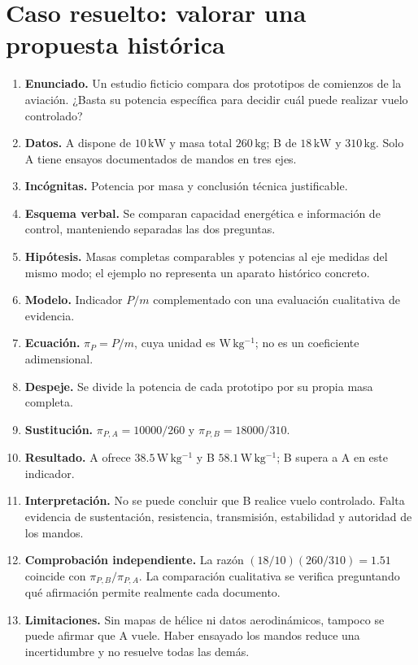 \section{Caso resuelto: valorar una propuesta histórica}
\begin{enumerate}
\item \textbf{Enunciado.} Un estudio ficticio compara dos prototipos de comienzos de la aviación. ¿Basta su potencia específica para decidir cuál puede realizar vuelo controlado?
\item \textbf{Datos.} A dispone de $10\,\mathrm{kW}$ y masa total $260\,\mathrm{kg}$; B de $18\,\mathrm{kW}$ y $310\,\mathrm{kg}$. Solo A tiene ensayos documentados de mandos en tres ejes.
\item \textbf{Incógnitas.} Potencia por masa y conclusión técnica justificable.
\item \textbf{Esquema verbal.} Se comparan capacidad energética e información de control, manteniendo separadas las dos preguntas.
\item \textbf{Hipótesis.} Masas completas comparables y potencias al eje medidas del mismo modo; el ejemplo no representa un aparato histórico concreto.
\item \textbf{Modelo.} Indicador $P/m$ complementado con una evaluación cualitativa de evidencia.
\item \textbf{Ecuación.} $\pi_P=P/m$, cuya unidad es $\mathrm{W\,kg^{-1}}$; no es un coeficiente adimensional.
\item \textbf{Despeje.} Se divide la potencia de cada prototipo por su propia masa completa.
\item \textbf{Sustitución.} $\pi_{P,A}=10000/260$ y $\pi_{P,B}=18000/310$.
\item \textbf{Resultado.} A ofrece $38.5\,\mathrm{W\,kg^{-1}}$ y B $58.1\,\mathrm{W\,kg^{-1}}$; B supera a A en este indicador.
\item \textbf{Interpretación.} No se puede concluir que B realice vuelo controlado. Falta evidencia de sustentación, resistencia, transmisión, estabilidad y autoridad de los mandos.
\item \textbf{Comprobación independiente.} La razón $(18/10)(260/310)=1.51$ coincide con $\pi_{P,B}/\pi_{P,A}$. La comparación cualitativa se verifica preguntando qué afirmación permite realmente cada documento.
\item \textbf{Limitaciones.} Sin mapas de hélice ni datos aerodinámicos, tampoco se puede afirmar que A vuele. Haber ensayado los mandos reduce una incertidumbre y no resuelve todas las demás.
\end{enumerate}

